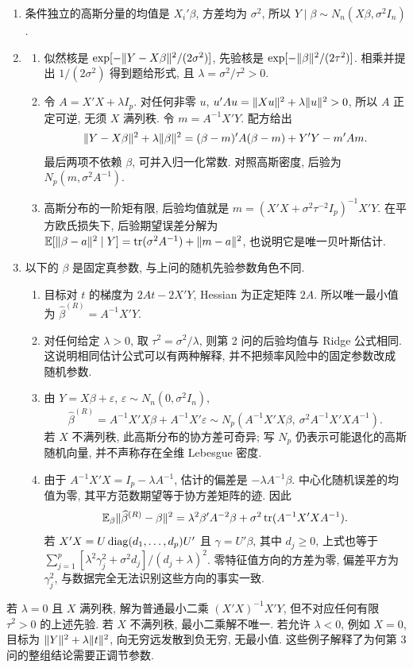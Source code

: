 \begin{solution}
\begin{enumerate}[label=\arabic*.]
\item 条件独立的高斯分量的均值是 $X_i'\beta$, 方差均为 $\sigma^2$, 所以 $Y\mid\beta\sim N_n(X\beta,\sigma^2 I_n)$.
\item
\begin{enumerate}[label=\alph*)]
\item 似然核是 $\exp[-\lVert Y-X\beta\rVert^2/(2\sigma^2)]$, 先验核是 $\exp[-\lVert \beta\rVert^2/(2\tau^2)]$. 相乘并提出 $1/(2\sigma^2)$ 得到题给形式, 且 $\lambda=\sigma^2/\tau^2>0$.
\item 令 $A=X'X+\lambda I_p$. 对任何非零 $u$, $u'Au=\lVert Xu\rVert^2+\lambda\lVert u\rVert^2>0$, 所以 $A$ 正定可逆, 无须 $X$ 满列秩. 令 $m=A^{-1}X'Y$. 配方给出
\[
\lVert Y-X\beta\rVert^2+\lambda\lVert \beta\rVert^2
=(\beta-m)'A(\beta-m)+Y'Y-m'Am.
\]
最后两项不依赖 $\beta$, 可并入归一化常数. 对照高斯密度, 后验为 $N_p(m,\sigma^2 A^{-1})$.
\item 高斯分布的一阶矩有限, 后验均值就是 $m=(X'X+\sigma^2\tau^{-2}I_p)^{-1}X'Y$. 在平方欧氏损失下, 后验期望误差分解为 $\mathbb E[\lVert \beta-a\rVert^2\mid Y]=\operatorname{tr}(\sigma^2A^{-1})+\lVert m-a\rVert^2$, 也说明它是唯一贝叶斯估计.
\end{enumerate}
\item 以下的 $\beta$ 是固定真参数, 与上问的随机先验参数角色不同.
\begin{enumerate}[label=\alph*)]
\item 目标对 $t$ 的梯度为 $2At-2X'Y$, Hessian 为正定矩阵 $2A$. 所以唯一最小值为 $\widehat\beta^{(R)}=A^{-1}X'Y$.
\item 对任何给定 $\lambda>0$, 取 $\tau^2=\sigma^2/\lambda$, 则第 2 问的后验均值与 Ridge 公式相同. 这说明相同估计公式可以有两种解释, 并不把频率风险中的固定参数改成随机参数.
\item 由 $Y=X\beta+\varepsilon$, $\varepsilon\sim N_n(0,\sigma^2I_n)$,
\[
\widehat\beta^{(R)}=A^{-1}X'X\beta+A^{-1}X'\varepsilon
\sim N_p\left(A^{-1}X'X\beta,\ \sigma^2A^{-1}X'XA^{-1}\right).
\]
若 $X$ 不满列秩, 此高斯分布的协方差可奇异; 写 $N_p$ 仍表示可能退化的高斯随机向量, 并不声称存在全维 Lebesgue 密度.
\item 由于 $A^{-1}X'X=I_p-\lambda A^{-1}$, 估计的偏差是 $-\lambda A^{-1}\beta$. 中心化随机误差的均值为零, 其平方范数期望等于协方差矩阵的迹. 因此
\[
\mathbb E_\beta\lVert \widehat\beta^{(R)}-\beta\rVert^2
=\lambda^2\beta'A^{-2}\beta+
\sigma^2\operatorname{tr}(A^{-1}X'XA^{-1}).
\]
若 $X'X=U\operatorname{diag}(d_1,\ldots,d_p)U'$ 且 $\gamma=U'\beta$, 其中 $d_j\ge0$, 上式也等于 $\sum_{j=1}^p[\lambda^2\gamma_j^2+\sigma^2d_j]/(d_j+\lambda)^2$. 零特征值方向的方差为零, 偏差平方为 $\gamma_j^2$, 与数据完全无法识别这些方向的事实一致.
\end{enumerate}
\end{enumerate}
若 $\lambda=0$ 且 $X$ 满列秩, 解为普通最小二乘 $(X'X)^{-1}X'Y$, 但不对应任何有限 $\tau^2>0$ 的上述先验. 若 $X$ 不满列秩, 最小二乘解不唯一. 若允许 $\lambda<0$, 例如 $X=0$, 目标为 $\lVert Y\rVert^2+\lambda\lVert t\rVert^2$, 向无穷远发散到负无穷, 无最小值. 这些例子解释了为何第 3 问的整组结论需要正调节参数.
\end{solution}

